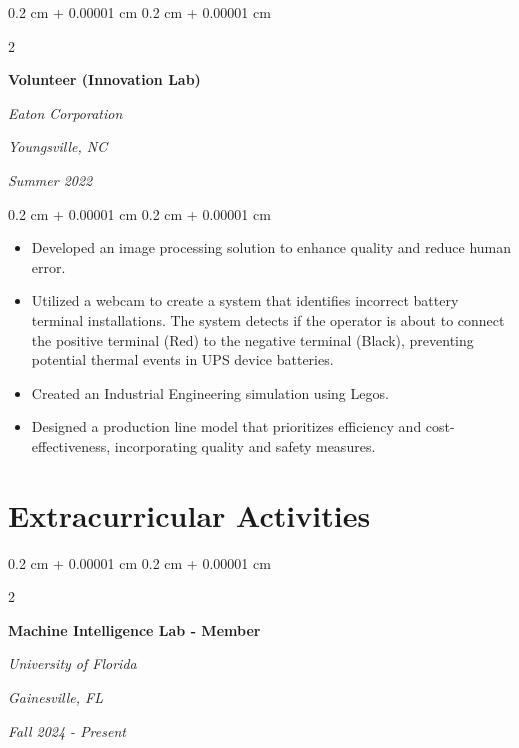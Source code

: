 \documentclass[10pt, letterpaper]{article}
\newenvironment{highlights}{
    \begin{itemize}[
        topsep=0.10 cm,
        parsep=0.10 cm,
        partopsep=0pt,
        itemsep=0pt,
        leftmargin=0.4 cm + 10pt
    ]
}{
    \end{itemize}
} %
\newenvironment{onecolentry}{
    \begin{adjustwidth}{
        0.2 cm + 0.00001 cm
    }{
        0.2 cm + 0.00001 cm
    }
}{
    \end{adjustwidth}
} %
\newenvironment{twocolentry}[2][]{
    \onecolentry
    \def\secondColumn{#2}
    \setcolumnwidth{\fill, 4.5 cm}
    \begin{paracol}{2}
}{
    \switchcolumn \raggedleft \secondColumn
    \end{paracol}
    \endonecolentry
} %
\begin{document}
        \vspace{0.2 cm}

        \begin{twocolentry}{
        \textit{Youngsville, NC}    
            
        \textit{Summer 2022}}
            \textbf{Volunteer (Innovation Lab)}
            
            \textit{Eaton Corporation}
        \end{twocolentry}

        \vspace{0.10 cm}
        \begin{onecolentry}
            \begin{highlights}
                \item Developed an image processing solution to enhance quality and reduce human error.
                \item Utilized a webcam to create a system that identifies incorrect battery terminal
                installations. The system detects if the operator is about to connect the positive terminal
                (Red) to the negative terminal (Black), preventing potential thermal events in UPS device
                batteries.
                \item Created an Industrial Engineering simulation using Legos.
                \item Designed a production line model that prioritizes efficiency and cost-effectiveness,
                incorporating quality and safety measures. 

            \end{highlights}
        \end{onecolentry}



    \section{Extracurricular Activities}

        
        \begin{twocolentry}{
        \textit{Gainesville, FL}    
            
        \textit{Fall 2024 - Present}}
            \textbf{Machine Intelligence Lab - Member}
            
            \textit{University of Florida}
        \end{twocolentry}
\end{document}
